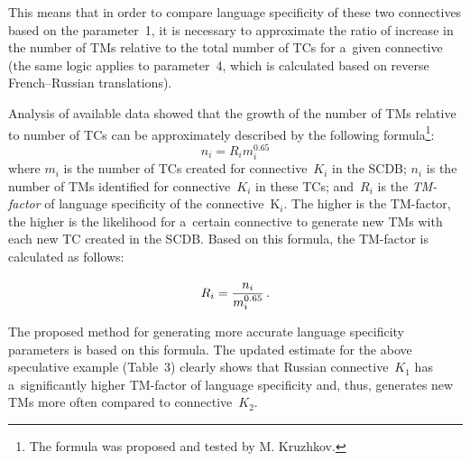 \begin{multicols}{2}
  
  This means that in order to compare language specificity of these two connectives 
based on the parameter~1, it is necessary to approximate the ratio of increase in the 
number of TMs relative to the total number of TCs for a~given connective (the same 
logic applies to parameter~4, which is calculated based on reverse French--Russian 
translations).
  
  Analysis of available data showed that the growth of the number of TMs relative to 
number of TCs can be approximately described by the following 
formula\footnote{The formula was proposed and tested by M. Kruzhkov.}:
  $$
  n_i=R_i  m_i^{0.65}
  $$
  where $m_i$ is the number of TCs created for connective~$K_i$ in the SCDB; 
$n_i$ is the number of TMs identified for connective~$K_i$ in these TCs; and~$R_i$ 
is the \textit{TM-factor} of language specificity of the connective~K$_i$. The higher 
is the TM-factor, the higher is the likelihood for a~certain connective to generate new 
TMs with each new TC created in the SCDB. Based on this formula, the TM-factor is 
calculated as follows:

\noindent
  $$
  R_i=\displaystyle\frac{\displaystyle n_i\mathstrut}{\displaystyle m_i^{0.65}\mathstrut}\,.
  $$
  
  The proposed method for generating more accurate language specificity 
parameters is based on this formula. The updated estimate for the above speculative 
example (Table~3) clearly shows that Russian connective~$K_1$ has 
a~significantly higher TM-factor of language specificity and, thus, generates new 
TMs more often compared to connective~$K_2$.
  
  \setcounter{table}{2}
  \begin{table*}\small %
  \begin{center}
  \Caption{Language specificity parameters based on the formula 
  $n_i = R_i  m_i^{0.65}$}
   \vspace*{2ex}
   

\end{center}
\end{table*}
\end{multicols}
